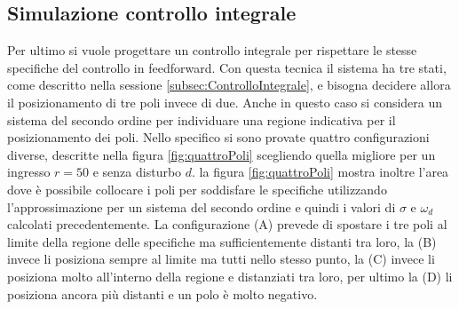 	\subsection{Simulazione controllo integrale}
	\label{subsec:ItegraleSim}	
		
		Per ultimo si vuole progettare un controllo integrale per rispettare le stesse specifiche del controllo in feedforward. Con questa tecnica il sistema ha tre stati, come descritto nella sessione \ref{subsec:ControlloIntegrale}, e bisogna decidere allora il posizionamento di tre poli invece di due. Anche in questo caso si considera un sistema del secondo ordine per individuare una regione indicativa per il posizionamento dei poli. Nello specifico si sono provate quattro configurazioni diverse, descritte nella figura \ref{fig:quattroPoli} scegliendo quella migliore per un ingresso $r=50$ e senza disturbo $d$. la figura \ref{fig:quattroPoli} mostra inoltre l'area dove è possibile collocare i poli per soddisfare le specifiche utilizzando l'approssimazione per un sistema del secondo ordine e quindi i valori di $\sigma$ e $\omega_d$ calcolati precedentemente. La configurazione (A) prevede di spostare i tre poli al limite della regione delle specifiche ma sufficientemente distanti tra loro, la (B) invece li posiziona sempre al limite ma tutti nello stesso punto, la (C) invece li posiziona molto all'interno della regione e distanziati tra loro, per ultimo la (D) li posiziona ancora più distanti e un polo è molto negativo.
		
